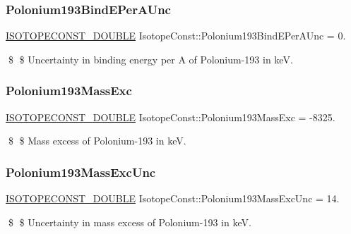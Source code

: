 \subsubsection{\texorpdfstring{Polonium193\+Bind\+E\+Per\+A\+Unc}{Polonium193BindEPerAUnc}}
{\footnotesize\ttfamily \mbox{\hyperlink{group___isotope_const-_macros_ga8f45a7272ce02c0b4c65c44636ed719a}{I\+S\+O\+T\+O\+P\+E\+C\+O\+N\+S\+T\+\_\+\+D\+O\+U\+B\+LE}} Isotope\+Const\+::\+Polonium193\+Bind\+E\+Per\+A\+Unc = 0.}

\$ \$ Uncertainty in binding energy per A of Polonium-\/193 in keV. \mbox{\label{group___isotope_const-_polonium-_po193_ga9cef1403c3101d9038634760b7fcde8d}} 
\subsubsection{\texorpdfstring{Polonium193\+Mass\+Exc}{Polonium193MassExc}}
{\footnotesize\ttfamily \mbox{\hyperlink{group___isotope_const-_macros_ga8f45a7272ce02c0b4c65c44636ed719a}{I\+S\+O\+T\+O\+P\+E\+C\+O\+N\+S\+T\+\_\+\+D\+O\+U\+B\+LE}} Isotope\+Const\+::\+Polonium193\+Mass\+Exc = -\/8325.}

\$ \$ Mass excess of Polonium-\/193 in keV. \mbox{\label{group___isotope_const-_polonium-_po193_ga8927dfbd90b0fe98ddb47773402f8ae7}} 
\subsubsection{\texorpdfstring{Polonium193\+Mass\+Exc\+Unc}{Polonium193MassExcUnc}}
{\footnotesize\ttfamily \mbox{\hyperlink{group___isotope_const-_macros_ga8f45a7272ce02c0b4c65c44636ed719a}{I\+S\+O\+T\+O\+P\+E\+C\+O\+N\+S\+T\+\_\+\+D\+O\+U\+B\+LE}} Isotope\+Const\+::\+Polonium193\+Mass\+Exc\+Unc = 14.}

\$ \$ Uncertainty in mass excess of Polonium-\/193 in keV. \mbox{\label{group___isotope_const-_polonium-_po193_gae8bca3b424757e16a7c3acbd9bf5ee55}} 
